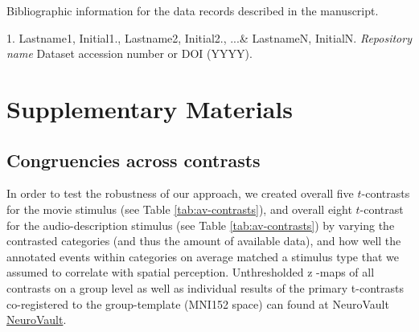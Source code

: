 \documentclass[english]{article}
\begin{document}

Bibliographic information for the data records described in the manuscript.

1. Lastname1, Initial1., Lastname2, Initial2., ...\& LastnameN, InitialN. \emph{Repository name} Dataset accession number or DOI (YYYY).

\citep{haeusler2016cutanno}
\citep{hausler2021studyforrest}
\citep{hanke2014audiomovie}
\citep{hanke2016simultaneous}
\citep{sengupta2016extension}


\appendix

\pagebreak[4]


\section{Supplementary Materials}

\subsection{Congruencies across contrasts}


In order to test the robustness of our approach, we created overall five
$t$-contrasts for the movie stimulus (see Table \ref{tab:av-contrasts}), and
overall eight $t$-contrast for the audio-description stimulus (see Table
\ref{tab:av-contrasts}) by varying the contrasted categories (and thus the
amount of available data), and how well the annotated events within categories
on average matched a stimulus type that we assumed to correlate with spatial
perception.
Unthresholded z -maps of all contrasts on a group level as well as individual
results of the primary t-contrasts co-registered to the group-template (MNI152
space) can found at NeuroVault
\href{https://neurovault.org/collections/KADGMGVZ/}{NeuroVault}.

\end{document}
